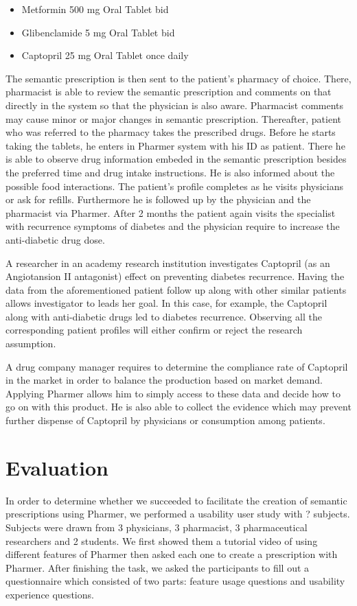 \documentclass[10pt, conference, compsocconf]{IEEEtran}
\begin{document}
\begin{itemize}
\item {Metformin} 500 mg Oral Tablet bid
\item {Glibenclamide} 5 mg Oral Tablet bid
\item {Captopril} 25 mg Oral Tablet once daily
\end{itemize}

The semantic prescription is then sent to the patient's pharmacy of choice.
There, pharmacist is able to review the semantic prescription and comments on that directly in the system so that the physician is also aware. Pharmacist comments may cause minor or major changes in semantic prescription.
Thereafter, patient who was referred to the pharmacy takes the prescribed drugs.
Before he starts taking the tablets, he enters in Pharmer system with his ID as patient.
There he is able to observe drug information embeded in the semantic prescription besides the preferred time and drug intake instructions.
He is also informed about the possible food interactions.
The patient's profile completes as he visits physicians or ask for refills.
Furthermore he is followed up by the physician and the pharmacist via Pharmer.
After 2 months the patient again visits the specialist with recurrence symptoms of diabetes and the physician require to increase the anti-diabetic drug dose.

A researcher in an academy research institution investigates Captopril (as an Angiotansion II antagonist) effect on preventing diabetes recurrence.
Having the data from the aforementioned patient follow up along with other similar patients allows investigator to leads her goal.
In this case, for example, the Captopril along with anti-diabetic drugs led to diabetes recurrence.
Observing all the corresponding patient profiles will either confirm or reject the research assumption.

 A drug company manager requires to determine the compliance rate of Captopril in the market in order to balance the production based on market demand.
 Applying Pharmer allows him to simply access to these data and decide how to go on with this product.
 He is also able to collect the evidence which may prevent further dispense of Captopril by physicians or consumption among patients.




\section{Evaluation}
\label{sec:evaluation}
In order to determine whether we succeeded to facilitate the creation of semantic prescriptions using Pharmer, we performed a usability user study with ? subjects.
Subjects were drawn from 3 physicians, 3 pharmacist, 3 pharmaceutical researchers and 2 students.
We first showed them a tutorial video of using different features of Pharmer then asked each one to create a prescription with Pharmer.
After finishing the task, we asked the participants to fill out a questionnaire which consisted of two parts: feature usage questions and usability experience questions.
\end{document}

